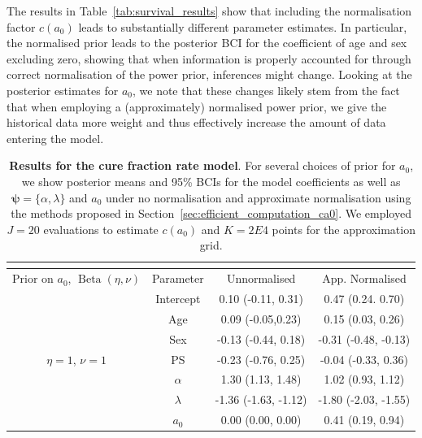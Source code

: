\documentclass[a4paper, notitlepage, 11pt]{article}
\begin{document}
The results in Table~\ref{tab:survival_results} show that including the normalisation factor $c(a_0)$ leads to substantially different parameter estimates.
In particular, the normalised prior leads to the posterior BCI for the coefficient of age and sex excluding zero, showing that when information is properly accounted for through correct normalisation of the power prior, inferences might change.
Looking at the posterior estimates for $a_0$, we note that these changes likely stem from the fact that when employing a (approximately) normalised power prior, we give the historical data more weight and thus effectively increase the amount of data entering the model.

\begin{table}[!ht]
\caption{\textbf{Results for the cure fraction rate model}.
For several choices of prior for $a_0$, we show posterior means and 95\% BCIs for the model coefficients as well as $\boldsymbol \psi = \{ \alpha, \lambda\}$ and $a_0$ under no normalisation and approximate normalisation using the methods proposed in Section~\ref{sec:efficient_computation_ca0}.
We employed $J = 20$ evaluations to estimate $c(a_0)$ and $K = 2E4$ points for the approximation grid.
}
\begin{tabular}{cccc}
\hline
                                            &           & \multicolumn{2}{c}{}                      \\ \hline
Prior on $a_0$, $\operatorname{Beta}(\eta, \nu)$    & Parameter & Unnormalised         & App. Normalised  \\
\hline
\multirow{7}{*}{$\eta = 1$, $\nu  = 1$}     & Intercept & 0.10 (-0.11, 0.31)   & 0.47 (0.24. 0.70)           \\
                                            & Age       & 0.09 (-0.05,0.23)    & 0.15 (0.03, 0.26)           \\
                                            & Sex    & -0.13 (-0.44, 0.18)  & -0.31 (-0.48, -0.13)        \\
                                            & PS        & -0.23 (-0.76, 0.25)  & -0.04 (-0.33, 0.36)         \\
                                            & $\alpha$  & 1.30 (1.13, 1.48)    & 1.02 (0.93, 1.12)           \\
                                            & $\lambda$ & -1.36 (-1.63, -1.12) & -1.80 (-2.03, -1.55)        \\
                                            & $a_0$     & 0.00 (0.00, 0.00)    & 0.41 (0.19, 0.94)           \\

\end{tabular}
\end{table}
\end{document}
